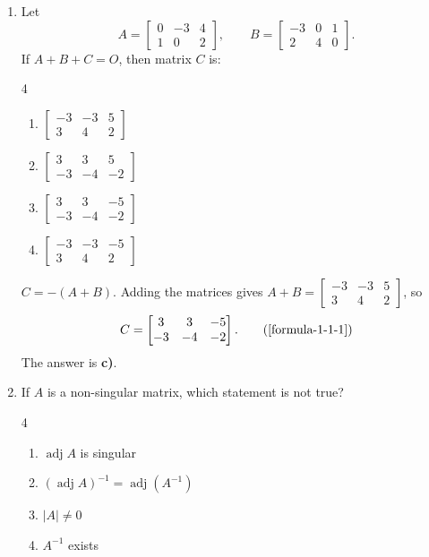 \begin{enumerate}[label={},leftmargin=1.15cm,labelwidth=1.0cm,labelsep=0.15cm,itemindent=0pt,listparindent=0pt,itemsep=\baselineskip,parsep=0pt,topsep=0pt]
\item[5.1.4] Let
\[
A=\begin{bmatrix}0&-3&4\\1&0&2\end{bmatrix},\qquad
B=\begin{bmatrix}-3&0&1\\2&4&0\end{bmatrix}.
\]
If $A+B+C=O$, then matrix $C$ is:

\begin{multicols}{4}
\begin{enumerate}
\setlength{\itemsep}{0pt}
    \item $\begin{bmatrix}-3&-3&5\\3&4&2\end{bmatrix}$
    \item $\begin{bmatrix}3&3&5\\-3&-4&-2\end{bmatrix}$
    \item $\begin{bmatrix}3&3&-5\\-3&-4&-2\end{bmatrix}$
    \item $\begin{bmatrix}-3&-3&-5\\3&4&2\end{bmatrix}$
\end{enumerate}
\end{multicols}

\vspace{0.6em}\par\solution


$C=-(A+B)$. Adding the matrices gives $A+B=\begin{bmatrix}-3&-3&5\\3&4&2\end{bmatrix}$, so
\begin{equation*}
C=\begin{bmatrix}3&3&-5\\-3&-4&-2\end{bmatrix}.
\tag*{(\ref{formula-1-1-1})}\end{equation*}
The answer is \textbf{c)}.

\item[5.1.5] If $A$ is a non-singular matrix, which statement is not true?

\begin{multicols}{4}
\begin{enumerate}
\setlength{\itemsep}{0pt}
    \item $\operatorname{adj} A$ is singular
    \item $(\operatorname{adj} A)^{-1}=\operatorname{adj}(A^{-1})$
    \item $|A|\ne0$
    \item $A^{-1}$ exists
\end{enumerate}
\end{multicols}


\end{enumerate}
